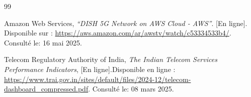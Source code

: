 \cleardoublepage
\renewcommand{\bibname}{Références bibliographiques}
\renewcommand{\refname}{Références bibliographiques}
{}
\begin{thebibliography}{99}

Amazon Web Services,
\textit{“DISH 5G Network on AWS Cloud - AWS”}. [En ligne]. Disponible sur :
\url{https://aws.amazon.com/ar/awstv/watch/c53334533b4/}. Consulté le: 16 mai 2025.

Telecom Regulatory Authority of India,
\textit{The Indian Telecom Services Performance Indicators}, [En ligne].Disponible en ligne :
\url{https://www.trai.gov.in/sites/default/files/2024-12/telecom-dashboard_compressed.pdf}. Consulté le: 08 mars 2025.



\end{thebibliography}



\cleardoublepage %
